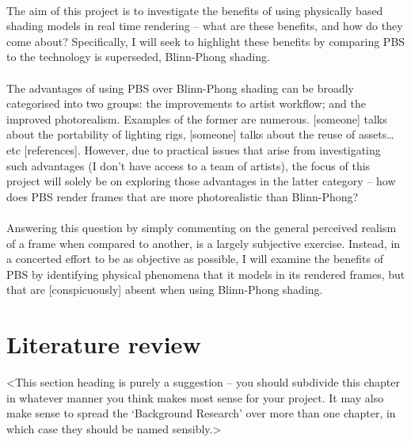 \paragraph{}The aim of this project is to investigate the benefits of using physically based shading models in real time rendering – what are these benefits, and how do they come about? Specifically, I will seek to highlight these benefits by comparing PBS to the technology is superseded, Blinn-Phong shading.

\paragraph{}The advantages of using PBS over Blinn-Phong shading can be broadly categorised into two groups: the improvements to artist workflow; and the improved photorealism. Examples of the former are numerous. [someone] talks about the portability of lighting rigs, [someone] talks about the reuse of assets… etc [references]. However, due to practical issues that arise from investigating such advantages (I don’t have access to a team of artists), the focus of this project will solely be on exploring those advantages in the latter category – how does PBS render frames that are more photorealistic than Blinn-Phong?

\paragraph{}Answering this question by simply commenting on the general perceived realism of a frame when compared to another, is a largely subjective exercise. Instead, in a concerted effort to be as objective as possible, I will examine the benefits of PBS by identifying physical phenomena that it models in its rendered frames, but that are [conspicuously] absent when using Blinn-Phong shading.


\section{Literature review}
<This section heading is purely a suggestion -- you should subdivide this chapter in whatever manner you think makes most sense for your project. It may also make sense to spread the `Background Research' over more than one chapter, in which case they should be named sensibly.>

